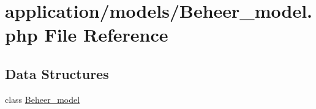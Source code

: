 \hypertarget{_beheer__model_8php}{}\section{application/models/\+Beheer\+\_\+model.php File Reference}
\label{_beheer__model_8php}
\subsection*{Data Structures}
\begin{DoxyCompactItemize}
\item 
class \mbox{\hyperlink{class_beheer__model}{Beheer\+\_\+model}}
\end{DoxyCompactItemize}
